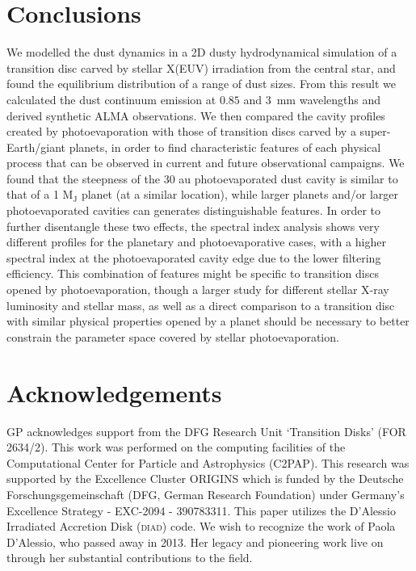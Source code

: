 \documentclass[fleqn,usenatbib]{mnras}
\begin{document}
\section{Conclusions} \label{sec:conclusions}

We modelled the dust dynamics in a 2D dusty hydrodynamical simulation of a transition disc carved by stellar X(EUV) irradiation from the central star, and found the equilibrium distribution of a range of dust sizes.
From this result we calculated the dust continuum emission at $0.85$ and \SI{3}{mm} wavelengths and derived synthetic ALMA observations. We then compared the cavity profiles created by photoevaporation with those of transition discs carved by a super-Earth/giant planets, in order to find characteristic features of each physical process that can be observed in current and future observational campaigns.
We found that the steepness of the 30 au photoevaporated dust cavity is similar to that of a 1 M$_\mathrm{J}$ planet (at a similar location), while larger planets and/or larger photoevaporated cavities can generates distinguishable features.
In order to further disentangle these two effects, the spectral index analysis shows very different profiles for the planetary and photoevaporative cases, with a higher spectral index at the photoevaporated cavity edge due to the lower filtering efficiency.
This combination of features might be specific to transition discs opened by photoevaporation, though a larger study for different stellar X-ray luminosity and stellar mass, as well as a direct comparison to a transition disc with similar physical properties opened by a planet should be necessary to better constrain the parameter space covered by stellar photoevaporation.

\section*{Acknowledgements}
GP acknowledges support from the DFG Research Unit ‘Transition Disks’ (FOR 2634/2).
This work was performed on the computing facilities of the Computational Center for Particle and Astrophysics (C2PAP).
This research was supported by the Excellence Cluster ORIGINS which is funded by the Deutsche Forschungsgemeinschaft (DFG, German Research Foundation) under Germany's Excellence Strategy - EXC-2094 - 390783311.
This paper utilizes the D’Alessio Irradiated Accretion Disk (\textsc{diad}) code. We wish to recognize the work of Paola D’Alessio, who passed away in 2013. Her legacy and pioneering work live on through her substantial contributions to the field.
\end{document}
